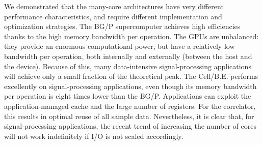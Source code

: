 \documentclass{article}
\begin{document}
We demonstrated that the many-core architectures have very
different performance characteristics, and require different
implementation and optimization strategies.  The BG/P supercomputer
achieves high efficiencies thanks to the high memory bandwidth per
operation. The GPUs are unbalanced: they provide an enormous
computational power, but have a relatively low bandwidth per
operation, both internally and externally (between the host and the device).
Because of this, many data-intensive signal-processing applications will
achieve only a small fraction of the theoretical peak.
The \mbox{Cell/B.E.} performs excellently on signal-processing
applications, even though its memory bandwidth per operation is eight
times lower than the BG/P.  Applications can exploit the
application-managed cache and the large number of registers. For the
correlator, this results in optimal reuse of all sample data.  Nevertheless,
it is clear that, for signal-processing applications,
the recent trend of increasing the number of cores will not work indefinitely if
I/O is not scaled accordingly.






\begin{small}

\end{small}
\end{document}
